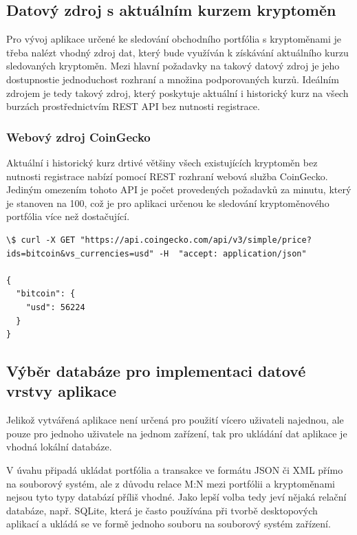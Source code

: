 \documentclass[12pt, a4paper]{article}
\begin{document}
    \subsection{Datový zdroj s aktuálním kurzem kryptoměn}

    Pro vývoj aplikace určené ke sledování obchodního portfólia s kryptoměnami je třeba nalézt vhodný zdroj dat, který bude využíván k získávání aktuálního kurzu sledovaných kryptoměn. Mezi hlavní požadavky na takový datový zdroj je jeho dostupnostie jednoduchost rozhraní a množina podporovaných kurzů. Ideálním zdrojem je tedy takový zdroj, který poskytuje aktuální i historický kurz na všech burzách prostřednictvím REST API bez nutnosti registrace.

    \subsubsection{Webový zdroj CoinGecko}
    Aktuální i historický kurz drtivé většiny všech existujících kryptoměn bez nutnosti registrace nabízí pomocí REST rozhraní webová služba CoinGecko\cite{coingecko2021}. Jediným omezením tohoto API je počet provedených požadavků za minutu, který je stanoven na 100, což je pro aplikaci určenou ke sledování kryptoměnového portfólia více než dostačující.

    \begin{lstlisting}
\$ curl -X GET "https://api.coingecko.com/api/v3/simple/price?ids=bitcoin&vs_currencies=usd" -H  "accept: application/json"

{
  "bitcoin": {
    "usd": 56224
  }
}
    \end{lstlisting}

    \subsection{Výběr databáze pro implementaci datové vrstvy aplikace}

    Jelikož vytvářená aplikace není určená pro použití vícero uživateli najednou, ale pouze pro jednoho uživatele na jednom zařízení, tak pro ukládání dat aplikace je vhodná lokální databáze.

    V úvahu připadá ukládat portfólia a transakce ve formátu JSON či XML přímo na souborový systém, ale z důvodu relace M:N mezi portfólii a kryptoměnami nejsou tyto typy databází příliš vhodné. Jako lepší volba tedy jeví nějaká relační databáze, např. SQLite, která je často používána při tvorbě desktopových aplikací a ukládá se ve formě jednoho souboru na souborový systém zařízení.
    
\end{document}

